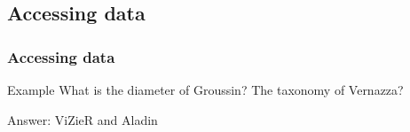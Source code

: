 \subsection{Accessing data}
\begin{frame}
  \frametitle{Accessing data}

  \begin{exampleblock}{Example}
    What is the diameter of Groussin? The taxonomy of Vernazza?
  \end{exampleblock}

  \begin{block}{Answer: ViZieR and Aladin}
  \end{block}
\end{frame}




